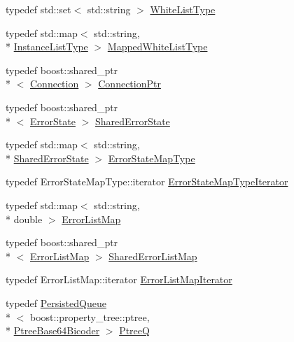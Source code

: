 \begin{DoxyCompactItemize}
\item 
typedef std\-::set$<$ std\-::string $>$ \hyperlink{namespacekisscpp_a6aa00ccbe46e3a892fa90d3fbf6e3439}{White\-List\-Type}
\item 
typedef std\-::map$<$ std\-::string, \\*
\hyperlink{structkisscpp_1_1_instance_list_type}{Instance\-List\-Type} $>$ \hyperlink{namespacekisscpp_a33979b59a2b404e85c9416071d843412}{Mapped\-White\-List\-Type}
\item 
typedef boost\-::shared\-\_\-ptr\\*
$<$ \hyperlink{classkisscpp_1_1_connection}{Connection} $>$ \hyperlink{namespacekisscpp_a4632e92aebdc8fa1c220da260469cbb2}{Connection\-Ptr}
\item 
typedef boost\-::shared\-\_\-ptr\\*
$<$ \hyperlink{classkisscpp_1_1_error_state}{Error\-State} $>$ \hyperlink{namespacekisscpp_af77de115307b379cbcab83a1fc54fdad}{Shared\-Error\-State}
\item 
typedef std\-::map$<$ std\-::string, \\*
\hyperlink{namespacekisscpp_af77de115307b379cbcab83a1fc54fdad}{Shared\-Error\-State} $>$ \hyperlink{namespacekisscpp_ab99725cc511536c050d9cab582313d0c}{Error\-State\-Map\-Type}
\item 
typedef Error\-State\-Map\-Type\-::iterator \hyperlink{namespacekisscpp_a37b3f68e4626dc05d9d2381803a889b4}{Error\-State\-Map\-Type\-Iterator}
\item 
typedef std\-::map$<$ std\-::string, \\*
double $>$ \hyperlink{namespacekisscpp_a325b559f17774bf1155d5dda8fe335e3}{Error\-List\-Map}
\item 
typedef boost\-::shared\-\_\-ptr\\*
$<$ \hyperlink{namespacekisscpp_a325b559f17774bf1155d5dda8fe335e3}{Error\-List\-Map} $>$ \hyperlink{namespacekisscpp_a52b7a11959a119c1da931042d7751db0}{Shared\-Error\-List\-Map}
\item 
typedef Error\-List\-Map\-::iterator \hyperlink{namespacekisscpp_a5493eddaf40e71c5f85672b1ab37afcb}{Error\-List\-Map\-Iterator}
\item 
typedef \hyperlink{classkisscpp_1_1_persisted_queue}{Persisted\-Queue}\\*
$<$ boost\-::property\-\_\-tree\-::ptree, \\*
\hyperlink{classkisscpp_1_1_ptree_base64_bicoder}{Ptree\-Base64\-Bicoder} $>$ \hyperlink{namespacekisscpp_af1d6724570f46ac378171bd45ddf6903}{Ptree\-Q}

\end{DoxyCompactItemize}

